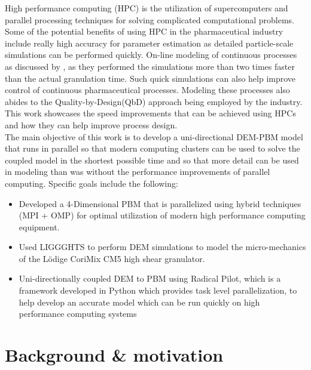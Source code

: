 \documentclass[preprint,11pt,authoryear]{elsarticle}
\begin{document}
High performance computing (HPC) is the utilization of supercomputers and parallel processing
techniques for solving complicated computational problems. Some of the potential benefits of using
HPC in the pharmaceutical industry include really high accuracy for parameter estimation as detailed 
particle-scale simulations can be performed quickly. On-line modeling of continuous processes as 
discussed by \citep{Bettencourt2017}, as they performed the simulations more than two times faster 
than the actual granulation time. Such quick simulations can also help improve control of 
continuous pharmaceutical processes. Modeling these processes also abides to the 
Quality-by-Design(QbD) approach being employed by the industry. This work showcases the speed 
improvements that can be achieved using HPCs and how they can help improve process design.  
\\The main objective of this work is to develop a uni-directional DEM-PBM model that runs in 
parallel so that modern computing clusters can be used to solve the coupled model in the 
shortest possible time and so that more detail can be used in modeling than was without the performance improvements of parallel computing. Specific goals include the 
following:
\begin{itemize}
\item Developed a 4-Dimensional PBM that is parallelized using hybrid techniques (MPI + 
OMP)  for optimal utilization of modern high performance computing equipment.
\item Used LIGGGHTS to perform DEM simulations to  model the micro-mechanics of the 
L\"{o}dige CoriMix CM5 high shear granulator. 
\item Uni-directionally coupled DEM to PBM using Radical Pilot, which is a framework developed in
Python which provides task level parallelization, to help develop an accurate model which can be 
run quickly on high performance computing systems
\end{itemize}

\section{Background \& motivation}
\end{document}
